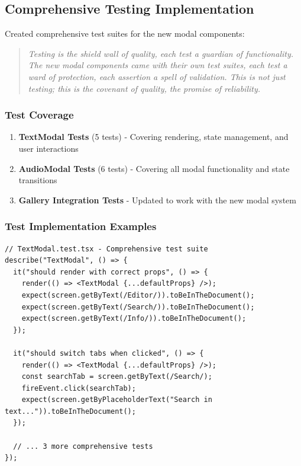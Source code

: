 \documentclass[11pt]{article}
\begin{document}
\subsection{Comprehensive Testing Implementation}

Created comprehensive test suites for the new modal components:

\begin{quote}
\emph{Testing is the shield wall of quality, each test a guardian of functionality. The new modal components came with their own test suites, each test a ward of protection, each assertion a spell of validation. This is not just testing; this is the covenant of quality, the promise of reliability.}
\end{quote}

\subsubsection{Test Coverage}

\begin{enumerate}
\item \textbf{TextModal Tests} (5 tests) - Covering rendering, state management, and user interactions
\item \textbf{AudioModal Tests} (6 tests) - Covering all modal functionality and state transitions
\item \textbf{Gallery Integration Tests} - Updated to work with the new modal system
\end{enumerate}

\subsubsection{Test Implementation Examples}

\begin{lstlisting}[style=typescript]
// TextModal.test.tsx - Comprehensive test suite
describe("TextModal", () => {
  it("should render with correct props", () => {
    render(() => <TextModal {...defaultProps} />);
    expect(screen.getByText(/Editor/)).toBeInTheDocument();
    expect(screen.getByText(/Search/)).toBeInTheDocument();
    expect(screen.getByText(/Info/)).toBeInTheDocument();
  });

  it("should switch tabs when clicked", () => {
    render(() => <TextModal {...defaultProps} />);
    const searchTab = screen.getByText(/Search/);
    fireEvent.click(searchTab);
    expect(screen.getByPlaceholderText("Search in text...")).toBeInTheDocument();
  });

  // ... 3 more comprehensive tests
});
\end{lstlisting}
\end{document}
